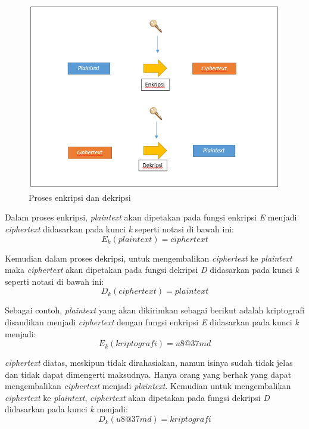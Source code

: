 \begin{figure}[H]
\includegraphics[scale=0.5]{Gambar/encryption_decryption}
\centering
\caption{Proses enkripsi dan dekripsi}
\label{fig:prosesenkripsidekripsi}
\end{figure}

Dalam proses enkripsi, \textit{plaintext} akan dipetakan pada fungsi enkripsi \textit{E} menjadi \textit{ciphertext} didasarkan pada kunci \textit{k} seperti notasi di bawah ini:
\begin{displaymath}
	E_k(plaintext) = ciphertext
\end{displaymath}

Kemudian dalam proses dekripsi, untuk mengembalikan \textit{ciphertext} ke \textit{plaintext} maka \textit{ciphertext} akan dipetakan pada fungsi dekripsi \textit{D} didasarkan pada kunci \textit{k} seperti notasi di bawah ini:
\begin{displaymath}
	D_k(ciphertext)=plaintext
\end{displaymath}

Sebagai contoh, \textit{plaintext} yang akan dikirimkan sebagai berikut adalah kriptografi disandikan menjadi \textit{ciphertext} dengan fungsi enkripsi \textit{E} didasarkan pada kunci \textit{k} menjadi:
\begin{displaymath}
E_k(kriptografi)=u8@37md
\end{displaymath}

\noindent \textit{ciphertext} diatas, meskipun tidak dirahasiakan, namun isinya sudah tidak jelas dan tidak dapat dimengerti maksudnya. Hanya orang yang berhak yang dapat mengembalikan \textit{ciphertext} menjadi \textit{plaintext}. Kemudian untuk mengembalikan \textit{ciphertext} ke \textit{plaintext}, \textit{ciphertext} akan dipetakan pada fungsi dekripsi \textit{D} didasarkan pada kunci \textit{k} menjadi:
\begin{displaymath}
D_k(u8@37md)=kriptografi
\end{displaymath}

